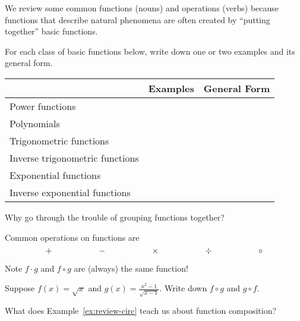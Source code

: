 \documentclass[../main.tex]{subfiles}
\begin{document}
\clearpage

We review some common functions (nouns) and operations (verbs) because functions that describe natural phenomena are often created by ``putting together'' basic functions.

\begin{example}
  For each class of basic functions below, write down one or two examples and its general form.

  \begin{center}
    \begin{tabular}{p{1.25in}p{3.5in}|p{1.5in}}
      & Examples & General Form \\\midrule
      Power \newline functions & & \\[0.5in]\midrule
      Polynomials & & \\[0.5in]\midrule
      Trigonometric \newline functions & & \\[0.5in]\midrule
      Inverse \newline trigonometric \newline functions & & \\[0.5in]\midrule
      Exponential \newline functions & & \\[0.5in]\midrule
      Inverse \newline exponential \newline functions & & \\[0.5in]
    \end{tabular}
  \end{center}
\end{example}

\faComments{} Why go through the trouble of grouping functions together?

\clearpage

Common operations on functions are
\[
  + \hspace{0.75in}
  - \hspace{0.75in}
  \times \hspace{0.75in}
  \div \hspace{0.75in}
  \circ
\]


\faExclamationTriangle{}
Note \(f \cdot g\) and \(f \circ g\) are \underline{} (always) the same function!


\begin{example} \label{ex:review-circ}
  Suppose \(f(x) = \sqrt{x}\) and \(g(x) = \frac{x^{2}-1}{\sqrt{x-1}}\). Write down \(f \circ g\) and \(g \circ f\).


  \faComments{} What does Example~\ref{ex:review-circ} teach us about function composition?

\end{example}
\clearpage
\end{document}
